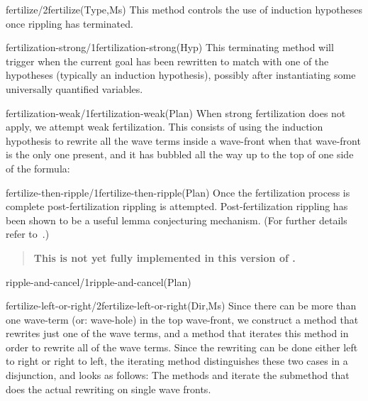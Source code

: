 \begin{method}{fertilize/2}{fertilize(Type,Ms)}%
{\tiny
}
This method controls the use of induction hypotheses once rippling
has terminated. 
\end{method}

\begin{method}{fertilization-strong/1}{fertilization-strong(Hyp)}%
{\tiny
}
This terminating method will trigger when the current goal has been
rewritten to match with one of the hypotheses (typically an induction
hypothesis), possibly after
instantiating some universally
quantified variables.
\end{method}

\begin{method}{fertilization-weak/1}{fertilization-weak(Plan)}%
When strong
fertilization
does not apply, we attempt weak fertilization.  This consists of using
the induction hypothesis to rewrite all the wave terms inside a
wave-front when that wave-front is the only one present, and it has
bubbled all the way up to the top of one side of the formula:

{\tiny
}
\end{method}

\begin{method}{fertilize-then-ripple/1}{fertilize-then-ripple(Plan)}%
Once the fertilization process is complete post-fertilization rippling
is attempted. Post-fertilization rippling has been shown to be a
useful lemma conjecturing mechanism. (For further details refer
to~\cite{pub567}.)

\begin{quote}
\bf This is not yet fully implemented in this version of \clam.
\end{quote}

{\tiny
}
\end{method}

\begin{method}{ripple-and-cancel/1}{ripple-and-cancel(Plan)}%
{\tiny
}
\end{method}


\begin{method}{fertilize-left-or-right/2}{fertilize-left-or-right(Dir,Ms)}%
Since there can be more than one wave-term (or: wave-hole) in the top 
wave-front, we construct a method that rewrites
just one of the wave terms, and a method that iterates this method
in order to rewrite all of the wave terms. Since the rewriting can be
done either left to right or right to left, the iterating method
distinguishes these two cases in a disjunction, and looks as follows:
{\tiny
}
The methods  and 
iterate the submethod that does the actual rewriting on single wave
fronts.
\end{method}

